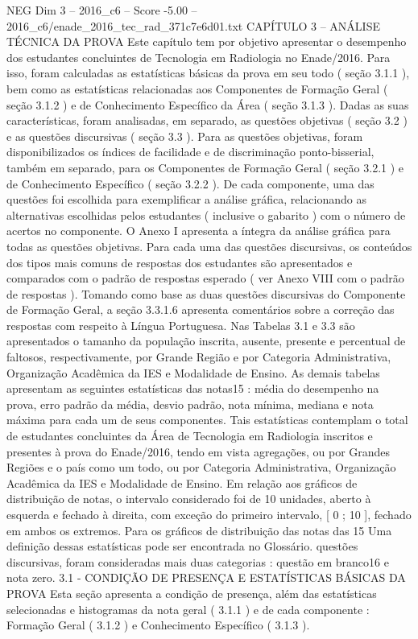 \begin{textsample}{NEG Dim 3 – 2016\_c6 – Score -5.00 – 2016\_c6/enade\_2016\_tec\_rad\_371c7e6d01.txt}  \label{ex:f3_neg_033}
CAPÍTULO 3 – ANÁLISE TÉCNICA DA PROVA Este capítulo tem por objetivo apresentar o desempenho dos estudantes concluintes de Tecnologia em Radiologia no Enade/2016.
Para isso, foram calculadas as estatísticas básicas da prova em seu todo ( seção 3.1.1 ), bem como as estatísticas relacionadas aos Componentes de Formação Geral ( seção 3.1.2 ) e de Conhecimento Específico da Área ( seção 3.1.3 ).
Dadas as suas características, foram analisadas, em separado, as questões objetivas ( seção 3.2 ) e as questões discursivas ( seção 3.3 ).
Para as questões objetivas, foram disponibilizados os índices de facilidade e de discriminação ponto-bisserial, também em separado, para os Componentes de Formação Geral ( seção 3.2.1 ) e de Conhecimento Específico ( seção 3.2.2 ).
De cada componente, uma das questões foi escolhida para exemplificar a análise gráfica, relacionando as alternativas escolhidas pelos estudantes ( inclusive o gabarito ) com o número de acertos no componente.
O Anexo I apresenta a íntegra da análise gráfica para todas as questões objetivas.
Para cada uma das questões discursivas, os conteúdos dos tipos mais comuns de respostas dos estudantes são apresentados e comparados com o padrão de respostas esperado ( ver Anexo VIII com o padrão de respostas ).
Tomando como base as duas questões discursivas do Componente de Formação Geral, a seção 3.3.1.6 apresenta comentários sobre a correção das respostas com respeito à Língua Portuguesa.
Nas Tabelas 3.1 e 3.3 são apresentados o tamanho da população inscrita, ausente, presente e percentual de faltosos, respectivamente, por Grande Região e por Categoria Administrativa, Organização Acadêmica da IES e Modalidade de Ensino.
As demais tabelas apresentam as seguintes estatísticas das notas15 : média do desempenho na prova, erro padrão da média, desvio padrão, nota mínima, mediana e nota máxima para cada um de seus componentes.
Tais estatísticas contemplam o total de estudantes concluintes da Área de Tecnologia em Radiologia inscritos e presentes à prova do Enade/2016, tendo em vista agregações, ou por Grandes Regiões e o país como um todo, ou por Categoria Administrativa, Organização Acadêmica da IES e Modalidade de Ensino.
Em relação aos gráficos de distribuição de notas, o intervalo considerado foi de 10 unidades, aberto à esquerda e fechado à direita, com exceção do primeiro intervalo, [ 0 ; 10 ], fechado em ambos os extremos.
Para os gráficos de distribuição das notas das 15 Uma definição dessas estatísticas pode ser encontrada no Glossário. questões discursivas, foram consideradas mais duas categorias : questão em branco16 e nota zero. 3.1 - CONDIÇÃO DE PRESENÇA E ESTATÍSTICAS BÁSICAS DA PROVA Esta seção apresenta a condição de presença, além das estatísticas selecionadas e histogramas da nota geral ( 3.1.1 ) e de cada componente : Formação Geral ( 3.1.2 ) e Conhecimento Específico ( 3.1.3 ).

\end{textsample}
